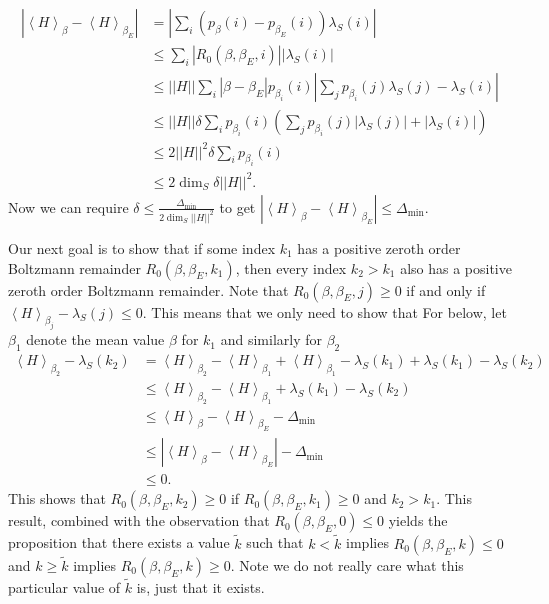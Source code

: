 \documentclass{article}
\newcommand{\parens}[1]{\left( #1 \right)}
\newcommand{\abs}[1]{\left| #1 \right|}
\newcommand{\norm}[1]{\left| \left| #1 \right| \right|}
\newcommand{\anglebrackets}[1]{\left< #1 \right>}
\begin{document}
\begin{align}
    \abs{\anglebrackets{H}_{\beta} - \anglebrackets{H}_{\beta_E}} &= \left| \sum_i (p_{\beta}(i) - p_{\beta_E}(i)) \lambda_S(i) \right| \\
    &\leq \sum_i \abs{R_0(\beta, \beta_E, i)} \abs{\lambda_S(i)} \\
    &\leq \norm{H} \sum_i |\beta - \beta_E| p_{\beta_i}(i) \abs{\sum_j p_{\beta_i}(j) \lambda_S(j) - \lambda_S(i)} \\
    &\leq \norm{H} \delta \sum_i p_{\beta_i}(i) \parens{\sum_{j} p_{\beta_i}(j) \abs{\lambda_S(j)} + \abs{\lambda_S(i)}} \\
    &\leq 2 \norm{H}^2 \delta \sum_i p_{\beta_i}(i) \\
    &\leq 2 \dim_S \delta \norm{H}^2.
\end{align}
Now we can require $\delta \leq \frac{\Delta_{\min}}{2 \dim_S \norm{H}^2}$ to get $\abs{\anglebrackets{H}_{\beta} - \anglebrackets{H}_{\beta_E}} \leq \Delta_{\min}$.

Our next goal is to show that if some index $k_1$ has a positive zeroth order Boltzmann remainder $R_0(\beta, \beta_E, k_1)$, then every index $k_2 > k_1$ also has a positive zeroth order Boltzmann remainder. Note that $R_0(\beta, \beta_E, j) \geq 0 $ if and only if $\anglebrackets{H}_{\beta_j} - \lambda_S(j) \leq 0$. This means that we only need to show that For below, let $\beta_1$ denote the mean value $\beta$ for $k_1$ and similarly for $\beta_2$
\begin{align}
    \anglebrackets{H}_{\beta_2} - \lambda_S(k_2) &= \anglebrackets{H}_{\beta_2} - \anglebrackets{H}_{\beta_1} + \anglebrackets{H}_{\beta_1} - \lambda_S(k_1) + \lambda_S(k_1) - \lambda_S(k_2) \\
    &\leq \anglebrackets{H}_{\beta_2} - \anglebrackets{H}_{\beta_1} + \lambda_S(k_1) - \lambda_S(k_2) \\
    &\leq \anglebrackets{H}_{\beta} - \anglebrackets{H}_{\beta_E} - \Delta_{\min} \\
    &\leq \abs{\anglebrackets{H}_{\beta} - \anglebrackets{H}_{\beta_E}} - \Delta_{\min} \\
    &\leq 0.
\end{align}
This shows that $R_0(\beta, \beta_E, k_2) \geq 0$ if $R_0(\beta, \beta_E, k_1) \geq 0$ and $k_2 > k_1$. This result, combined with the observation that $R_0(\beta, \beta_E, 0) \leq 0$ yields the proposition that there exists a value $\widetilde{k}$ such that $k < \widetilde{k}$ implies $R_0(\beta, \beta_E, k) \leq 0$ and $k \geq \widetilde{k}$ implies $R_0(\beta, \beta_E, k) \geq 0$. Note we do not really care what this particular value of $\widetilde{k}$ is, just that it exists.
\end{document}
